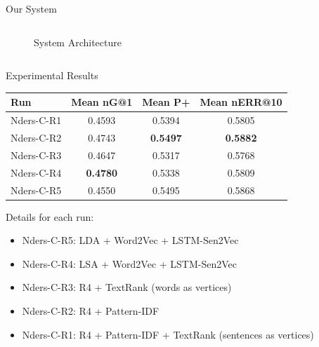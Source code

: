 \documentclass[final,hyperref={pdfpagelabels=false}]{beamer}
\begin{document}
\begin{frame}{}
\begin{block}{\large Our System}
\begin{columns}[t]
\begin{column}{.48\linewidth}
\begin{figure}
            \caption{System Architecture}
          \end{figure}
        \end{column}
      \end{columns}
      
    \end{block}
    \begin{columns}[t]
      \begin{column}{.49\linewidth}
        \begin{block}{Experimental Results}
          \begin{table}
          \centering
          \setlength\tabcolsep{1cm}
          \begin{tabular}{lccc}
          \hline
           Run        &  Mean nG@1  &  Mean P+  &  Mean nERR@10  \\ \hline
           Nders-C-R1 & 0.4593 & 0.5394 & 0.5805 \\ %
           Nders-C-R2 & 0.4743 & \textbf{0.5497} & \textbf{0.5882} \\ %
           Nders-C-R3 & 0.4647 & 0.5317 & 0.5768 \\ %
           Nders-C-R4 & \textbf{0.4780} & 0.5338 & 0.5809 \\ %
           Nders-C-R5 & 0.4550 & 0.5495 & 0.5868 \\ \hline
          \end{tabular}
          \end{table}
          Details for each run:
          \begin{itemize}
            \item{Nders-C-R5: } LDA + Word2Vec + LSTM-Sen2Vec 
            \item{Nders-C-R4: } LSA + Word2Vec + LSTM-Sen2Vec 
            \item{Nders-C-R3: } R4 + TextRank (words as vertices) 
            \item{Nders-C-R2: } R4 + Pattern-IDF
            \item{Nders-C-R1: } R4 + Pattern-IDF + TextRank (sentences as vertices)
          \end{itemize}
        \end{block}
      \end{column}
\end{columns}
\end{frame}
\end{document}

